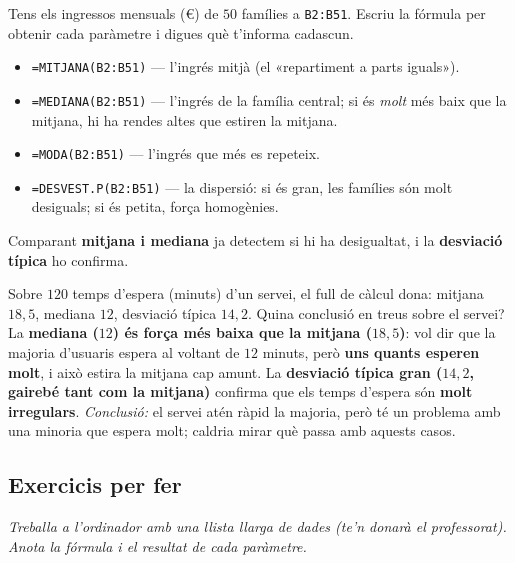 \begin{exresolt}
Tens els ingressos mensuals (€) de $50$ famílies a \texttt{B2:B51}. Escriu la fórmula
per obtenir cada paràmetre i digues què t'informa cadascun.
\solucio
\begin{itemize}[leftmargin=1.4em, itemsep=1pt]
  \item \texttt{=MITJANA(B2:B51)} — l'ingrés mitjà (el «repartiment a parts iguals»).
  \item \texttt{=MEDIANA(B2:B51)} — l'ingrés de la família central; si és \emph{molt}
        més baix que la mitjana, hi ha rendes altes que estiren la mitjana.
  \item \texttt{=MODA(B2:B51)} — l'ingrés que més es repeteix.
  \item \texttt{=DESVEST.P(B2:B51)} — la dispersió: si és gran, les famílies són molt
        desiguals; si és petita, força homogènies.
\end{itemize}
Comparant \textbf{mitjana i mediana} ja detectem si hi ha desigualtat, i la
\textbf{desviació típica} ho confirma.
\end{exresolt}

\begin{exresolt}
Sobre $120$ temps d'espera (minuts) d'un servei, el full de càlcul dona:
mitjana $18,5$, mediana $12$, desviació típica $14,2$. Quina conclusió en treus sobre
el servei?
\solucio
La \textbf{mediana ($12$) és força més baixa que la mitjana ($18,5$)}: vol dir que la
majoria d'usuaris espera al voltant de $12$ minuts, però \textbf{uns quants esperen
molt}, i això estira la mitjana cap amunt. La \textbf{desviació típica gran ($14,2$,
gairebé tant com la mitjana)} confirma que els temps d'espera són \textbf{molt
irregulars}. \emph{Conclusió:} el servei atén ràpid la majoria, però té un problema
amb una minoria que espera molt; caldria mirar què passa amb aquests casos.
\end{exresolt}

\subsection{Exercicis per fer}

\noindent\textit{Treballa a l'ordinador amb una llista llarga de dades (te'n donarà
el professorat). Anota la fórmula i el resultat de cada paràmetre.}

